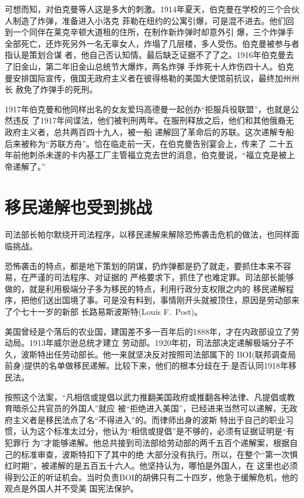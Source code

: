 \documentclass[10pt]{article}
\begin{document}
{可想而知，对伯克曼等人这是多大的刺激。1914年夏天，伯克曼在学校的三个合伙人制造了炸弹，准备进入小洛克
菲勒在纽约的公寓引爆，可是混不进去。他们回到一个同伴在莱克辛顿大道租的住所，在制作新炸弹时却意外引
爆，三个炸弹手全部死亡，还炸死另外一名无辜女人，炸塌了几层楼，多人受伤。伯克曼被参与者指认是策划合谋
者，他自己否认知情。最后缺乏证据不了了之。1916年伯克曼去了旧金山，第二年旧金山总统节大爆炸，两名炸弹
手炸死十人炸伤四十人。伯克曼安排国际宣传，俄国无政府主义者在彼得格勒的美国大使馆前抗议，最终加州州长
赦免了炸弹手的死刑。

1917年伯克曼和他同样出名的女友爱玛\textperiodcentered 高德曼一起创办``拒服兵役联盟''，也就是公然违反
了1917年间谍法，他们被判刑两年。在服刑释放之后，他们和其他俄裔无政府主义者，总共两百四十九人，被一船
递解回了革命后的苏联。这次递解专船后来被称为``苏联方舟''。恰在临走前一天，在伯克曼告别宴会上，传来了
二十五年前他刺杀未遂的卡内基工厂主管福立克去世的消息，伯克曼说，``福立克是被上帝递解了。''

\pagebreak
\section{移民递解也受到挑战}

司法部长帕尔默绕开司法程序，以移民递解来解除恐怖袭击危机的做法，也同样面临挑战。

恐怖袭击的特点，都是地下策划的阴谋，扔炸弹都是扔了就走，要抓住本来不容易，在严谨的司法程序、对证据的
严格要求下，抓住了也难定罪。司法部长能够做的，就是利用极端分子多为移民的特点，利用行政分支权限之内的
移民递解程序，把他们送出国境了事。可是没有料到，事情刚开头就被顶住，原因是劳动部来了个七十一岁的新部
长路易斯\textperiodcentered 波斯特(Louis F.~Post)。

美国曾经是个落后的农业国，建国差不多一百年后的1888年，才在内政部设立了劳动局。1913年威尔逊总统才建立
劳动部。1920年初，司法部决定递解极端分子不久，波斯特出任劳动部长。他一来就坚决反对按照司法部属下的
BOI(联邦调查局前身)提供的名单做移民递解。比较下来，他们的根本分歧在于:是否认同1918年移民法。

按照这个法案，``凡相信或提倡以武力推翻美国政府或推翻各种法律、凡提倡或教育暗杀公共官员的外国人''就应
被``拒绝进入美国''，已经进来当然可以递解，无政府主义者是移民法点了名``不得进入''的。而律师出身的波斯
特出于自己的职业习惯，认为这个标准太过分，他认为``相信或提倡''是不够的，必须有证据证明是``有犯罪行
为''才能够递解。他总共接到司法部给劳动部的两千五百个递解案，根据自己的标准审查，波斯特扣下了其中的绝
大部分没有执行。所以，在整个``第一次惧红时期''，被递解的是五百五十六人。他坚持认为，哪怕是外国人，在
这里也必须得到公正的听证机会。当时负责BOI的胡佛只有二十四岁，他急于缓解危机，他的观点是外国人并不受美
国宪法保护。

}
\end{document}
